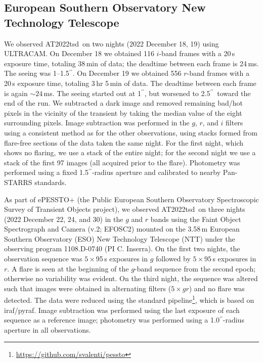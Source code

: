 \documentclass{nature_plusfigure}
\newcommand{\at}{AT2022tsd}
\newcommand{\arcsec}{$^{\prime\prime}$}
\begin{document}
\begin{methods}
\subsection{European Southern Observatory New Technology Telescope}
\label{sec:ntt}

We observed \at\ on two nights (2022 December 18, 19) using ULTRACAM\cite{Dhillon2007}. On December 18 we obtained 116 $i$-band frames with a 20\,s exposure time, totaling 38\,min of data; the deadtime between each frame is 24\,ms. The seeing was 1--1.5\arcsec. On December 19 we obtained 556 $r$-band frames with a 20\,s exposure time, totaling 3\,hr 5\,min of data. The deadtime between each frame is again $\sim 24$\,ms. The seeing started out at 1\arcsec, but worsened to 2.5\arcsec\ toward the end of the run. We subtracted a %
dark image and removed remaining bad/hot pixels in the vicinity of the transient by taking the median value of the eight surrounding pixels.  Image subtraction was performed in the $g$, $r$, and $i$ filters using a consistent method as for the other observations, using stacks formed from flare-free sections of the data taken the same night.  For the first night, which shows no flaring, we use a stack of the entire night; for the second night we use a stack of the first 97 images (all acquired prior to the flare).  %
Photometry was performed using a fixed 1.5\arcsec-radius aperture and calibrated to nearby Pan-STARRS standards.

As part of ePESSTO+ (the Public European Southern Observatory Spectroscopic Survey of Transient Objects project\cite{Smartt2015}), we observed \at\ on three nights (2022 December 22, 24, and 30) in the $g$ and $r$ bands using the Faint Object Spectrograph and Camera (v.2; EFOSC2\cite{Buzzoni1984}) mounted on the 3.58\,m European Southern Observatory (ESO) New Technology Telescope (NTT) under the observing program 1108.D-0740 (PI C. Inserra). On the first two nights, the observation sequence was $5\times$95\,s exposures in $g$ followed by $5\times95$\,s exposures in $r$.  A flare is seen at the beginning of the $g$-band sequence from the second epoch; otherwise no variability was evident. On the third night, the sequence was altered such that images were obtained in alternating filters ($5\times gr$) and no flare was detected. The data were reduced using the standard pipeline\footnote{\url{ https://github.com/svalenti/pessto}}, which is based on iraf/pyraf. Image subtraction was performed using the last exposure of each sequence as a reference image; photometry was performed using a 1.0\arcsec-radius aperture in all observations.


\end{methods}
\end{document}
